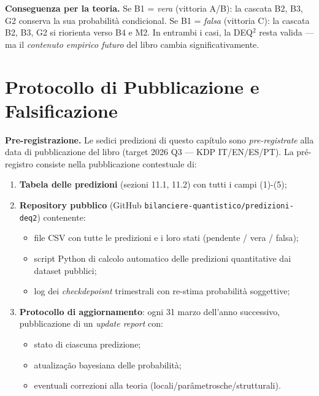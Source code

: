 \Hypoth{} \textbf{Conseguenza per la teoria.} Se B1 = \emph{vera}
(vittoria A/B): la cascata B2, B3, G2 conserva la sua probabilità
condicional. Se B1 = \emph{falsa} (vittoria C): la cascata B2, B3, G2
si riorienta verso B4 e M2. In entrambi i casi, la DEQ$^2$ resta valida ---
ma il \emph{contenuto empirico futuro} del libro cambia
significativamente.



\section{Protocollo di Pubblicazione e
Falsificazione}\label{protocollo-di-pubblicazione-e-falsificação}

\Hypoth{} \textbf{Pre-registrazione.} Le sedici predizioni di questo
capítulo sono \emph{pre-registrate} alla data di pubblicazione del libro
(target 2026 Q3 --- KDP IT/EN/ES/PT). La pré-registro consiste
nella pubblicazione contestuale di:

\begin{enumerate}
\def\labelenumi{\arabic{enumi}.}
\tightlist
\item
  \textbf{Tabela delle predizioni} (sezioni 11.1, 11.2) con tutti i
  campi (1)-(5);
\item
  \textbf{Repository pubblico} (GitHub
  \texttt{bilanciere-quantistico/predizioni-deq2}) contenente:

  \begin{itemize}
  \tightlist
  \item
    file CSV con tutte le predizioni e i loro stati (pendente / vera /
    falsa);
  \item
    script Python di calcolo automatico delle predizioni quantitative
    dai dataset pubblici;
  \item
    log dei \emph{checkdepoisnt} trimestrali con re-stima probabilità
    soggettive;
  \end{itemize}
\item
  \textbf{Protocollo di aggiornamento}: ogni 31 marzo dell'anno
  successivo, pubblicazione di un \emph{update report} con:

  \begin{itemize}
  \tightlist
  \item
    stato di ciascuna predizione;
  \item
    atualização bayesiana delle probabilità;
  \item
    eventuali correzioni alla teoria (locali/parâmetrosche/strutturali).
  \end{itemize}
\end{enumerate}

